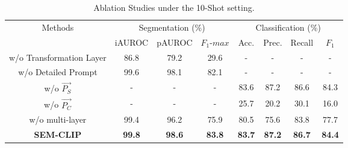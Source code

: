 \begin{table}[tb!]
    \centering
    \caption{Ablation Studies under the 10-Shot setting.}
    \resizebox{\linewidth}{!}
    {
        \begin{threeparttable}
            {
                \begin{tabular}{c c c c c c c c}
                    \toprule
                    \multirow{2}{*}{Methods} & \multicolumn{3}{c}{Segmentation (\%)} & \multicolumn{4}{c}{Classification (\%)} \\
                    \cmidrule(r){2-4} \cmidrule(l){5-8}
                    & iAUROC & pAUROC & $F_{1}$-$max$ & Acc. & Prec. & Recall & $F_{1}$ \\
                    \midrule
                    w/o Transformation Layer & 86.8 & 79.2 & 29.6 & - & - & - & - \\
                    w/o Detailed Prompt & 99.6 & 98.1 & 82.1 & - & - & - & -  \\
                    w/o $\vec{P_{S}}$  & - & - & - & 83.6 & 87.2 & 86.6 & 84.3 \\
                    w/o $\vec{P_{C}}$  & - & - & - & 25.7 & 20.2 & 30.1 & 16.0 \\
                    w/o multi-layer & 99.4 & 96.2 & 75.9 & 80.5 & 75.6 & 83.8 & 77.7 \\
                    \midrule
                    \textbf{SEM-CLIP} & \textbf{99.8} & \textbf{98.6} & \textbf{83.8} & \textbf{83.7} & \textbf{87.2} & \textbf{86.7} & \textbf{84.4} \\
                    \bottomrule
                \end{tabular}
            }
        \end{threeparttable}
    }
    \label{Ablation}
\end{table}

